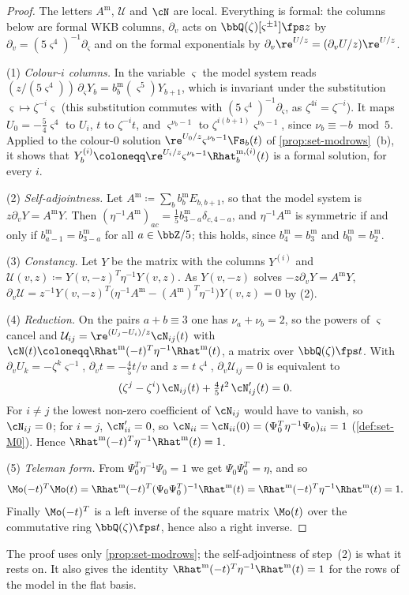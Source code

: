 \begin{proof}
The letters $A^{\mathrm m}$, $\mathcal U$ and $\cN$ are local. Everything is formal: the columns below are formal WKB columns, $\partial_v$ acts on $\bbQ(\zeta)[\varsigma^{\pm1}]\fps z$ by $\partial_v=(5\varsigma^4)^{-1}\partial_\varsigma$ and on the formal exponentials by $\partial_v\re^{U/z}=(\partial_vU/z)\re^{U/z}$.

(1) \emph{Colour-$i$ columns.} In the variable $\varsigma$ the model system reads $(z/(5\varsigma^4))\,\partial_\varsigma Y_b=b^{\mathrm m}_b(\varsigma^5)Y_{b+1}$, which is invariant under the substitution $\varsigma\mapsto\zeta^{-i}\varsigma$ (this substitution commutes with $(5\varsigma^4)^{-1}\partial_\varsigma$, as $\zeta^{4i}=\zeta^{-i}$). It maps $U_0=-\frac54\varsigma^4$ to $U_i$, $t$ to $\zeta^{-i}t$, and $\varsigma^{\nu_b-1}$ to $\zeta^{i(b+1)}\varsigma^{\nu_b-1}$, since $\nu_b\equiv-b\bmod5$. Applied to the colour-$0$ solution $\re^{U_0/z}\varsigma^{\nu_b-1}\Fs_b(t)$ of \cref{prop:set-modrows}~(b), it shows that $Y^{(i)}_b\coloneqq\re^{U_i/z}\varsigma^{\nu_b-1}\Rhat^{\mathrm m,(i)}_b(t)$ is a formal solution, for every $i$.

(2) \emph{Self-adjointness.} Let $A^{\mathrm m}\coloneqq\sum_bb^{\mathrm m}_bE_{b,b+1}$, so that the model system is $z\partial_vY=A^{\mathrm m}Y$. Then $(\eta^{-1}A^{\mathrm m})_{ac}=\frac15b^{\mathrm m}_{3-a}\delta_{c,4-a}$, and $\eta^{-1}A^{\mathrm m}$ is symmetric if and only if $b^{\mathrm m}_{a-1}=b^{\mathrm m}_{3-a}$ for all $a\in\bbZ/5$; this holds, since $b^{\mathrm m}_4=b^{\mathrm m}_3$ and $b^{\mathrm m}_0=b^{\mathrm m}_2$.

(3) \emph{Constancy.} Let $Y$ be the matrix with the columns $Y^{(i)}$ and $\mathcal U(v,z)\coloneqq Y(v,-z)^T\eta^{-1}Y(v,z)$. As $Y(v,-z)$ solves $-z\partial_vY=A^{\mathrm m}Y$, $\partial_v\mathcal U=z^{-1}Y(v,-z)^T\bigl(\eta^{-1}A^{\mathrm m}-(A^{\mathrm m})^T\eta^{-1}\bigr)Y(v,z)=0$ by (2).

(4) \emph{Reduction.} On the pairs $a+b\equiv3$ one has $\nu_a+\nu_b=2$, so the powers of $\varsigma$ cancel and $\mathcal U_{ij}=\re^{(U_j-U_i)/z}\cN_{ij}(t)$ with $\cN(t)\coloneqq\Rhat^{\mathrm m}(-t)^T\eta^{-1}\Rhat^{\mathrm m}(t)$, a matrix over $\bbQ(\zeta)\fps t$. With $\partial_vU_k=-\zeta^k\varsigma^{-1}$, $\partial_vt=-\frac45t/v$ and $z=t\varsigma^4$, $\partial_v\mathcal U_{ij}=0$ is equivalent to
\[
(\zeta^j-\zeta^i)\,\cN_{ij}(t)+\tfrac45t^2\,\cN_{ij}'(t)=0 .
\]
For $i\neq j$ the lowest non-zero coefficient of $\cN_{ij}$ would have to vanish, so $\cN_{ij}=0$; for $i=j$, $\cN_{ii}'=0$, so $\cN_{ii}=\cN_{ii}(0)=(\Psi_0^T\eta^{-1}\Psi_0)_{ii}=1$ (\cref{def:set-M0}). Hence $\Rhat^{\mathrm m}(-t)^T\eta^{-1}\Rhat^{\mathrm m}(t)=1$.

(5) \emph{Teleman form.} From $\Psi_0^T\eta^{-1}\Psi_0=1$ we get $\Psi_0\Psi_0^T=\eta$, and so
\[
\Mo(-t)^T\Mo(t)=\Rhat^{\mathrm m}(-t)^T(\Psi_0\Psi_0^T)^{-1}\Rhat^{\mathrm m}(t)=\Rhat^{\mathrm m}(-t)^T\eta^{-1}\Rhat^{\mathrm m}(t)=1 .
\]
Finally $\Mo(-t)^T$ is a left inverse of the square matrix $\Mo(t)$ over the commutative ring $\bbQ(\zeta)\fps t$, hence also a right inverse.
\end{proof}

The proof uses only \cref{prop:set-modrows}; the self-adjointness of step~(2) is what it rests on. It also gives the identity $\Rhat^{\mathrm m}(-t)^T\eta^{-1}\Rhat^{\mathrm m}(t)=1$ for the rows of the model in the flat basis.


